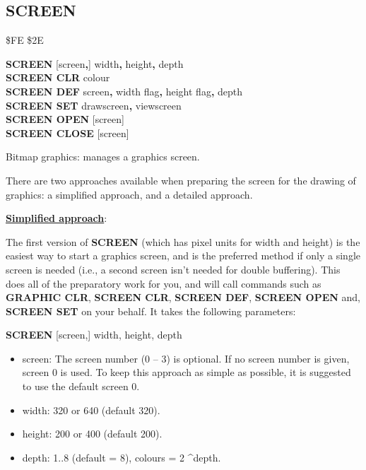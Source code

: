 \subsection{SCREEN}
\begin{description}[leftmargin=2cm,style=nextline]
\item [Token:]    \$FE \$2E

\item [Format:]   {\bf SCREEN} [screen{\bf,}] width{\bf,} height{\bf,} depth \\
                  {\bf SCREEN CLR} colour \\
                  {\bf SCREEN DEF} screen{\bf,} width flag{\bf,} height flag{\bf,} depth \\
                  {\bf SCREEN SET} drawscreen{\bf,} viewscreen \\
                  {\bf SCREEN OPEN} [screen] \\
                  {\bf SCREEN CLOSE} [screen]

\item [Usage:]    Bitmap graphics: manages a graphics screen.

                  There are two approaches available when preparing the screen for the drawing of graphics: a simplified approach, and a detailed approach.

                  \underline{{\bf Simplified approach}}:

                  The first version of {\bf SCREEN} (which has pixel units for width and height) is the easiest way to start a graphics screen, and is the preferred method if only a single screen is needed (i.e., a second screen isn't needed for double buffering). This does all of the preparatory work for you, and will call commands such as {\bf GRAPHIC CLR}, {\bf SCREEN CLR}, {\bf SCREEN DEF}, {\bf SCREEN OPEN} and, {\bf SCREEN SET} on your behalf. It takes the following parameters:

                  {\bf SCREEN} [screen,] width, height, depth

                  \begin{itemize}
                     \item screen: The screen number (0 -- 3) is optional. If no screen number is given, screen 0 is used. To keep this approach as simple as possible, it is suggested to use the default screen 0.
                     \item width: 320 or 640 (default 320).
                     \item height: 200 or 400 (default 200).
                     \item depth: 1..8 (default = 8), colours = 2 \textasciicircum depth.
                  \end{itemize}


\end{description}
